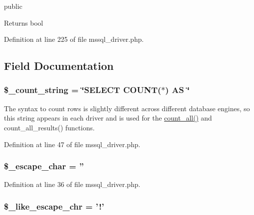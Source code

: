 public \begin{DoxyReturn}{Returns}
bool 
\end{DoxyReturn}


Definition at line 225 of file mssql\-\_\-driver.\-php.



\subsection{Field Documentation}
\hypertarget{class_c_i___d_b__mssql__driver_a06c80bac2ecbd0557827e96949c23097}{
\subsubsection[{\$\-\_\-count\-\_\-string}]{\setlength{\rightskip}{0pt plus 5cm}\$\-\_\-count\-\_\-string = \char`\"{}S\-E\-L\-E\-C\-T C\-O\-U\-N\-T($\ast$) A\-S \char`\"{}}}\label{class_c_i___d_b__mssql__driver_a06c80bac2ecbd0557827e96949c23097}
The syntax to count rows is slightly different across different database engines, so this string appears in each driver and is used for the \hyperlink{class_c_i___d_b__mssql__driver_a66111c61856499b091af32502978d4fc}{count\-\_\-all()} and count\-\_\-all\-\_\-results() functions. 

Definition at line 47 of file mssql\-\_\-driver.\-php.

\hypertarget{class_c_i___d_b__mssql__driver_aaec2fb0112850159063a8e47ad3aed6e}{
\subsubsection[{\$\-\_\-escape\-\_\-char}]{\setlength{\rightskip}{0pt plus 5cm}\$\-\_\-escape\-\_\-char = ''}}\label{class_c_i___d_b__mssql__driver_aaec2fb0112850159063a8e47ad3aed6e}


Definition at line 36 of file mssql\-\_\-driver.\-php.

\hypertarget{class_c_i___d_b__mssql__driver_a668acfd923d0342389cd3a614628cf2a}{
\subsubsection[{\$\-\_\-like\-\_\-escape\-\_\-chr}]{\setlength{\rightskip}{0pt plus 5cm}\$\-\_\-like\-\_\-escape\-\_\-chr = '!'}}\label{class_c_i___d_b__mssql__driver_a668acfd923d0342389cd3a614628cf2a}



